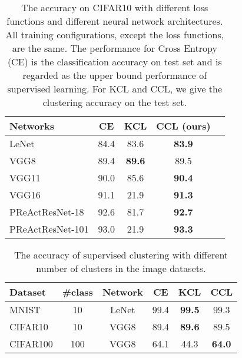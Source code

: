 \documentclass[10pt,twocolumn,letterpaper]{article}
\begin{document}
\begin{table}
\centering
\caption{The accuracy on CIFAR10 with different loss functions and different neural network architectures. All training configurations, except the loss functions, are the same. The performance for Cross Entropy (CE) is the classification accuracy on test set and is regarded as the upper bound performance of supervised learning. For KCL and CCL, we give the clustering accuracy \cite{yang2010image} on the test set.}
\label{deepnet}
\begin{tabular}{@{}lc|ccc@{}}
\toprule
Networks           & CE & KCL     & CCL (ours)      \\ \midrule
LeNet              & 84.4 & 83.6  & \textbf{83.9}    \\ 
VGG8               & 89.4        & \textbf{89.6}  & 89.5    \\
VGG11              & 90.0        & 85.6  & \textbf{90.4}    \\
VGG16              & 91.1        & 21.9  & \textbf{91.3}    \\
PReActResNet-18    & 92.6        & 81.7  & \textbf{92.7}    \\
PReActResNet-101   & 93.0        & 21.9  & \textbf{93.3}    \\
\bottomrule
\end{tabular}
\end{table}

\begin{table}
\centering
\caption{The accuracy of supervised clustering with different number of clusters in the image datasets.}
\label{supdatasets}
\begin{tabular}{lccc|cc}
\toprule
Dataset  & \#class & Network & CE     & KCL   & CCL       \\ \midrule
MNIST    & 10      & LeNet & 99.4   & \textbf{99.5}  & 99.3     \\
CIFAR10  & 10      & VGG8 & 89.4   & \textbf{89.6}  & 89.5     \\
CIFAR100 & 100     & VGG8 & 64.1   & 44.3  & \textbf{64.0}     \\ 
\bottomrule
\end{tabular}
\end{table}
\end{document}
